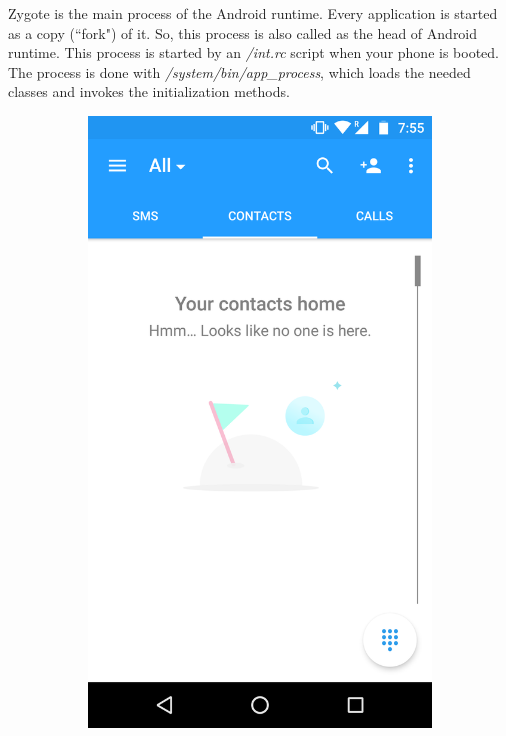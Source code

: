 Zygote is the main process of the Android runtime. Every application is started as  a copy (``fork") of it. So, this process is also called as the head of Android runtime. This process is started by an \textit{/int.rc} script when your phone is booted. The process is done with \textit{/system/bin/app\_process}, which loads the needed classes and invokes the initialization methods.

\begin{figure}[h]
	\centering
	\begin{subfigure}[h]{0.45\textwidth}
		\centering
		\includegraphics[width=\textwidth]{restrict_sol1.png}

\end{subfigure}
\end{figure}
